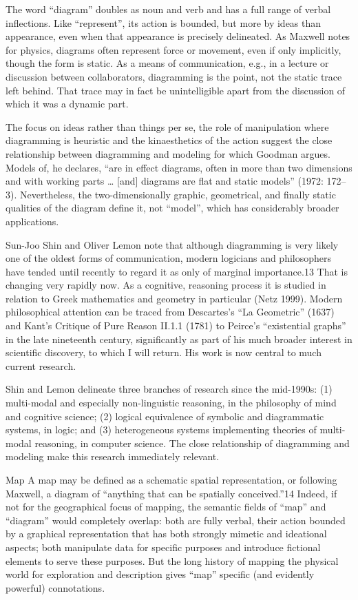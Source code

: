 The word ``diagram'' doubles as noun and verb and has a full range of
verbal inflections. Like ``represent'', its action is bounded, but more
by ideas than appearance, even when that appearance is precisely
delineated. As Maxwell notes for physics, diagrams often represent force
or movement, even if only implicitly, though the form is static. As a
means of communication, e.g., in a lecture or discussion between
collaborators, diagramming is the point, not the static trace left
behind. That trace may in fact be unintelligible apart from the
discussion of which it was a dynamic part.

The focus on ideas rather than things per se, the role of manipulation
where diagramming is heuristic and the kinaesthetics of the action
suggest the close relationship between diagramming and modeling for
which Goodman argues. Models of, he declares, ``are in effect diagrams,
often in more than two dimensions and with working parts \ldots{}
{[}and{]} diagrams are flat and static models'' (1972: 172--3).
Nevertheless, the two-dimensionally graphic, geometrical, and finally
static qualities of the diagram define it, not ``model'', which has
considerably broader applications.

Sun-Joo Shin and Oliver Lemon note that although diagramming is very
likely one of the oldest forms of communication, modern logicians and
philosophers have tended until recently to regard it as only of marginal
importance.13 That is changing very rapidly now. As a cognitive,
reasoning process it is studied in relation to Greek mathematics and
geometry in particular (Netz 1999). Modern philosophical attention can
be traced from Descartes's ``La Geometric'' (1637) and Kant's Critique
of Pure Reason II.1.1 (1781) to Peirce's ``existential graphs'' in the
late nineteenth century, significantly as part of his much broader
interest in scientific discovery, to which I will return. His work is
now central to much current research.

Shin and Lemon delineate three branches of research since the mid-1990s:
(1) multi-modal and especially non-linguistic reasoning, in the
philosophy of mind and cognitive science; (2) logical equivalence of
symbolic and diagrammatic systems, in logic; and (3) heterogeneous
systems implementing theories of multi-modal reasoning, in computer
science. The close relationship of diagramming and modeling make this
research immediately relevant.

Map A map may be defined as a schematic spatial representation, or
following Maxwell, a diagram of ``anything that can be spatially
conceived.''14 Indeed, if not for the geographical focus of mapping, the
semantic fields of ``map'' and ``diagram'' would completely overlap:
both are fully verbal, their action bounded by a graphical
representation that has both strongly mimetic and ideational aspects;
both manipulate data for specific purposes and introduce fictional
elements to serve these purposes. But the long history of mapping the
physical world for exploration and description gives ``map'' specific
(and evidently powerful) connotations.

